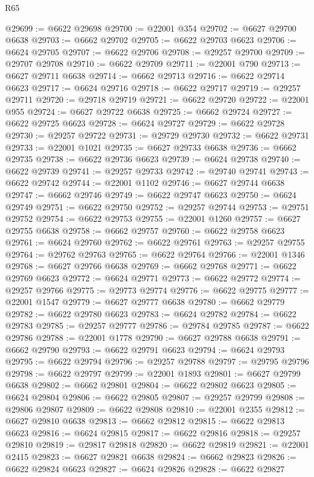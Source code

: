 \begin{lexlean}{R65}
\begin{coremodule}
{@29699 := @6622 @29698
@29700 := @22001 @354
@29702 := @6627 @29700 @6638
@29703 := @6662 @29702
@29705 := @6622 @29703 @6623
@29706 := @6624 @29705
@29707 := @6622 @29706
@29708 := @29257 @29700
@29709 := @29707 @29708
@29710 := @6622 @29709
@29711 := @22001 @790
@29713 := @6627 @29711 @6638
@29714 := @6662 @29713
@29716 := @6622 @29714 @6623
@29717 := @6624 @29716
@29718 := @6622 @29717
@29719 := @29257 @29711
@29720 := @29718 @29719
@29721 := @6622 @29720
@29722 := @22001 @955
@29724 := @6627 @29722 @6638
@29725 := @6662 @29724
@29727 := @6622 @29725 @6623
@29728 := @6624 @29727
@29729 := @6622 @29728
@29730 := @29257 @29722
@29731 := @29729 @29730
@29732 := @6622 @29731
@29733 := @22001 @1021
@29735 := @6627 @29733 @6638
@29736 := @6662 @29735
@29738 := @6622 @29736 @6623
@29739 := @6624 @29738
@29740 := @6622 @29739
@29741 := @29257 @29733
@29742 := @29740 @29741
@29743 := @6622 @29742
@29744 := @22001 @1102
@29746 := @6627 @29744 @6638
@29747 := @6662 @29746
@29749 := @6622 @29747 @6623
@29750 := @6624 @29749
@29751 := @6622 @29750
@29752 := @29257 @29744
@29753 := @29751 @29752
@29754 := @6622 @29753
@29755 := @22001 @1260
@29757 := @6627 @29755 @6638
@29758 := @6662 @29757
@29760 := @6622 @29758 @6623
@29761 := @6624 @29760
@29762 := @6622 @29761
@29763 := @29257 @29755
@29764 := @29762 @29763
@29765 := @6622 @29764
@29766 := @22001 @1346
@29768 := @6627 @29766 @6638
@29769 := @6662 @29768
@29771 := @6622 @29769 @6623
@29772 := @6624 @29771
@29773 := @6622 @29772
@29774 := @29257 @29766
@29775 := @29773 @29774
@29776 := @6622 @29775
@29777 := @22001 @1547
@29779 := @6627 @29777 @6638
@29780 := @6662 @29779
@29782 := @6622 @29780 @6623
@29783 := @6624 @29782
@29784 := @6622 @29783
@29785 := @29257 @29777
@29786 := @29784 @29785
@29787 := @6622 @29786
@29788 := @22001 @1778
@29790 := @6627 @29788 @6638
@29791 := @6662 @29790
@29793 := @6622 @29791 @6623
@29794 := @6624 @29793
@29795 := @6622 @29794
@29796 := @29257 @29788
@29797 := @29795 @29796
@29798 := @6622 @29797
@29799 := @22001 @1893
@29801 := @6627 @29799 @6638
@29802 := @6662 @29801
@29804 := @6622 @29802 @6623
@29805 := @6624 @29804
@29806 := @6622 @29805
@29807 := @29257 @29799
@29808 := @29806 @29807
@29809 := @6622 @29808
@29810 := @22001 @2355
@29812 := @6627 @29810 @6638
@29813 := @6662 @29812
@29815 := @6622 @29813 @6623
@29816 := @6624 @29815
@29817 := @6622 @29816
@29818 := @29257 @29810
@29819 := @29817 @29818
@29820 := @6622 @29819
@29821 := @22001 @2415
@29823 := @6627 @29821 @6638
@29824 := @6662 @29823
@29826 := @6622 @29824 @6623
@29827 := @6624 @29826
@29828 := @6622 @29827
}
\end{coremodule}
\end{lexlean}
